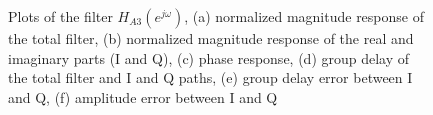 \documentclass[a4paper,BCOR7mm,12pt,pointlessnumbers,bibtotoc]{scrartcl}
\begin{document}
\begin{figure}[H]
  \caption{Plots of the filter $H_{A3}(e^{j \omega})$, (a) normalized magnitude response of the total filter, (b) normalized magnitude response of the real and imaginary parts (I and Q), (c) phase response, (d) group delay of the total filter and I and Q paths, (e) group delay error between I and Q, (f) amplitude error between I and Q}
	\label{fig:h_a3}
\end{figure}
\end{document}
